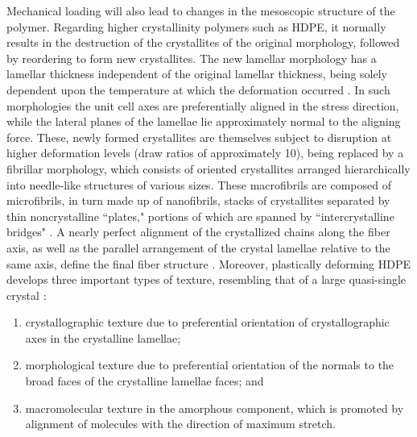 Mechanical loading will also lead to changes in the mesoscopic structure of the polymer.
Regarding higher crystallinity polymers such as HDPE, it normally results in the destruction of the crystallites of the original morphology, followed by reordering to form new crystallites.
The new lamellar morphology has a lamellar thickness independent of the original lamellar thickness, being solely dependent upon the temperature at which the deformation occurred .
In such morphologies the unit cell axes are preferentially aligned in the stress direction, while the lateral planes of the lamellae lie approximately normal to the aligning force.
These, newly formed crystallites are themselves subject to disruption at higher deformation levels (draw ratios of approximately 10), being replaced by a fibrillar morphology, which consists of oriented crystallites arranged hierarchically into needle-like structures of various sizes.
These macrofibrils are composed of microfibrils, in turn made up of nanofibrils, stacks of crystallites separated by thin noncrystalline “plates," portions of which are spanned by “intercrystalline bridges" \citep{peacockHandbookPolyethyleneStructures2014}.
A nearly perfect alignment of the crystallized chains along the fiber axis, as well as the parallel arrangement of the crystal lamellae relative to the same axis, define the final fiber structure \citep{peterlinMolecularModelDrawing1971}.
Moreover, plastically deforming HDPE develops three important types of texture, resembling that of a large quasi-single crystal \citep{argonPhysicsDeformationFracture2013a}:
\begin{enumerate}
	\item crystallographic texture due to preferential orientation of crystallographic axes in the crystalline lamellae;
	\item morphological texture due to preferential orientation of the normals to the broad faces of the crystalline lamellae faces; and
	\item macromolecular texture in the amorphous component, which is promoted by alignment of molecules with the direction of maximum stretch.
\end{enumerate}

